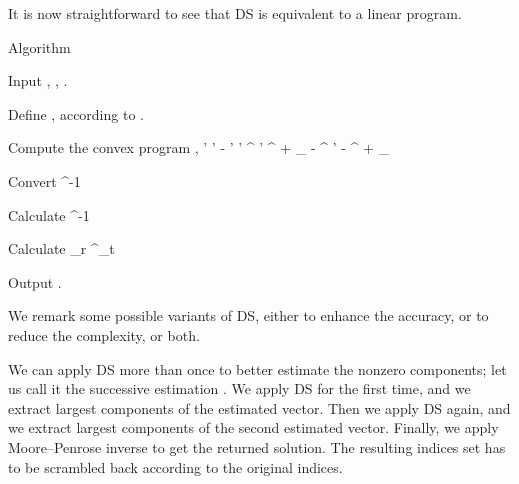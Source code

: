 \stopsubsection

\startsubsection [title={Linear Program}]

It is now straightforward to see that DS is equivalent to a linear program.

\Result
{Algorithm}
{
\startitemize[n]
\item Input , , .
%
\item Define , according to .
%
\item Compute the convex program
 {
\NC {}, 
\LA \NC \startcases
   \NC {}  \MC {} \NR
   \NC {} \;  \MC {}' \preceq {}' \NR
   \NC \MC - ' \preceq {}' \NR
   \NC \MC {}^\Adj {} ' \preceq {}^\Adj {} + \g_{}  \NR
   \NC \MC - ^\Adj {} ' \preceq - ^\Adj {} + \g_{}  \NR
\stopcases \NR
}
\item Convert
%
 {
\NC {}
\LA \NC {} ^{-1}  \NR
}
\item Calculate
%
 {
\NC {}
\LA \NC {}^{-1}  \NR
}
\item Calculate
%
 {
\NC {}
\LA \NC {} _r  ^\Adj _t \NR
}
\item Output .
\stopitemize
}

\stopsubsection

\startsection [title={Variants}]

We remark some possible variants of DS, either to enhance the accuracy, or to reduce the complexity, or both.

\startsubsection [title={Successive estimation of nonzero components}]

We can apply DS more than once to better estimate the nonzero components;
let us call it the successive estimation \cite {CaT07}.
We apply DS for the first time, and we extract largest components of the estimated vector.
Then we apply DS again, and we extract largest components of the second estimated vector.
Finally, we apply Moore–Penrose inverse to get the returned solution.
The resulting indices set has to be scrambled back according to the original indices.


